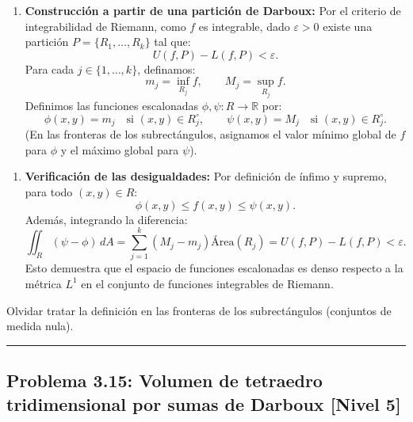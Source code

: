 \documentclass[11pt,a4paper]{article}
\begin{document}
\begin{enumerate}[label=\textbf{\arabic*.}]
\item \textbf{Construcción a partir de una partición de Darboux:}
Por el criterio de integrabilidad de Riemann, como $f$ es integrable, dado $\varepsilon > 0$ existe una partición $P = \{R_1, \dots, R_k\}$ tal que:
\begin{equation*}
U(f, P) - L(f, P) < \varepsilon.
\end{equation*}
Para cada $j \in \{1, \dots, k\}$, definamos:
\begin{equation*}
m_j = \inf_{R_j} f, \qquad M_j = \sup_{R_j} f.
\end{equation*}
Definimos las funciones escalonadas $\phi, \psi: R \to \mathbb{R}$ por:
\begin{equation*}
\phi(x,y) = m_j \quad \text{si } (x,y) \in R_j^\circ, \qquad \psi(x,y) = M_j \quad \text{si } (x,y) \in R_j^\circ.
\end{equation*}
(En las fronteras de los subrectángulos, asignamos el valor mínimo global de $f$ para $\phi$ y el máximo global para $\psi$).
\end{enumerate}

\begin{enumerate}[label=\textbf{\arabic*.}]
\item \textbf{Verificación de las desigualdades:}
Por definición de ínfimo y supremo, para todo $(x,y) \in R$:
\begin{equation*}
\phi(x,y) \le f(x,y) \le \psi(x,y).
\end{equation*}
Además, integrando la diferencia:
\begin{equation*}
\iint_R (\psi - \phi) \, dA = \sum_{j=1}^k (M_j - m_j) \text{Área}(R_j) = U(f, P) - L(f, P) < \varepsilon.
\end{equation*}
Esto demuestra que el espacio de funciones escalonadas es denso respecto a la métrica $L^1$ en el conjunto de funciones integrables de Riemann.
\end{enumerate}

\begin{trapbox}
Olvidar tratar la definición en las fronteras de los subrectángulos (conjuntos de medida nula).
\end{trapbox}

\vspace{0.5cm}
\hrule
\vspace{0.5cm}

\subsection*{Problema 3.15: Volumen de tetraedro tridimensional por sumas de Darboux \hfill \color{primaryblue}\small[Nivel 5]}
\end{document}
